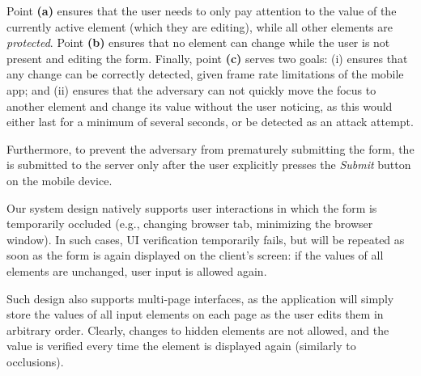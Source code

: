 Point \textbf{(a)} ensures that the user needs to only pay attention to the value of the currently active element (which they are editing), while all other elements are \emph{protected}.
Point \textbf{(b)} ensures that no element can change while the user is not present and editing the form.
Finally, point \textbf{(c)} serves two goals: (i) ensures that any change can be correctly detected, given frame rate limitations of the mobile app; and (ii) ensures that the adversary can not quickly move the focus to another element and change its value without the user noticing, as this would either last for a minimum of several seconds, or be detected as an attack attempt.


Furthermore, to prevent the adversary from prematurely submitting the form, the \POI is submitted to the server only after the user explicitly presses the \emph{Submit} button on the mobile device.


Our system design natively supports user interactions in which the form is temporarily occluded (e.g., changing browser tab, minimizing the browser window).
In such cases, UI verification temporarily fails, but will be repeated as soon as the form is again displayed on the client's screen: if the values of all elements are unchanged, user input is allowed again.

Such design also supports multi-page interfaces, as the application will simply store the values of all input elements on each page as the user edits them in arbitrary order.
Clearly, changes to hidden elements are not allowed, and the value is verified every time the element is displayed again (similarly to occlusions).

